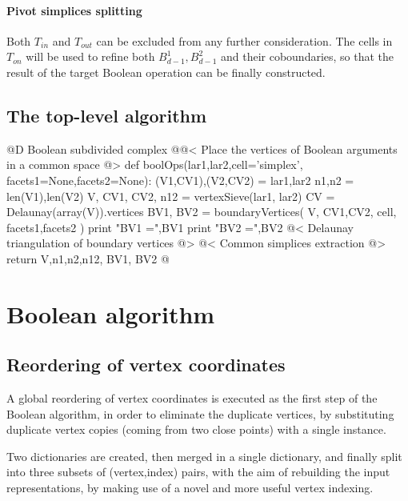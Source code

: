 \documentclass[11pt,oneside]{article}	%
\begin{document}
\paragraph{Pivot simplices splitting}
Both $T_{{in}}$ and $T_{{out}}$ can be excluded from any further consideration. The cells in $T_{{on}}$ will be used to refine both $B_{d-1}^1,B_{d-1}^2$ and their coboundaries, so that the result of the target Boolean operation can be finally constructed. 


\subsection{The top-level algorithm}
@D Boolean subdivided complex
@{@< Place the vertices of Boolean arguments in a common space @>
def boolOps(lar1,lar2,cell='simplex', facets1=None,facets2=None):
	(V1,CV1),(V2,CV2) = lar1,lar2
	n1,n2 = len(V1),len(V2)
	V, CV1, CV2, n12 = vertexSieve(lar1, lar2)
	CV = Delaunay(array(V)).vertices
	BV1, BV2 = boundaryVertices( V, CV1,CV2, cell, facets1,facets2 )
	print "\n BV1 =",BV1
	print "\n BV2 =",BV2
	@< Delaunay triangulation of boundary vertices @>
	@< Common simplices extraction @>
	return V,n1,n2,n12, BV1, BV2
@}



\section{Boolean algorithm}
\subsection{Reordering of vertex coordinates}
A global reordering of vertex coordinates is executed as the first step of the Boolean algorithm, in order to eliminate the duplicate vertices, by substituting duplicate vertex copies (coming from two close points) with a single instance. 

Two dictionaries are created, then merged in a single dictionary, and finally split into three subsets of (vertex,index) pairs, with the aim of rebuilding the input representations, by making use of a novel and more useful vertex indexing.
\end{document}
